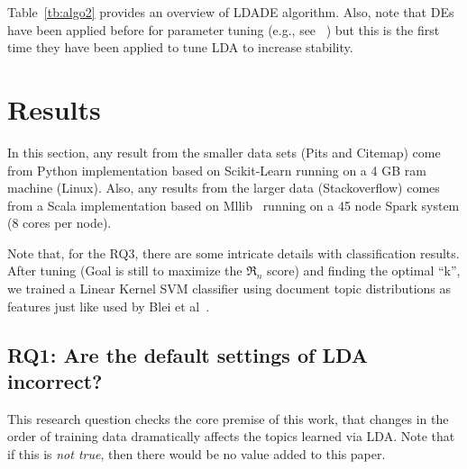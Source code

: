 \documentclass[twocolumn,5p,sort&compress]{elsarticle}
\theoremstyle{break}
\begin{document}
Table~\ref{tb:algo2} provides an overview of LDADE algorithm. Also, note that DEs have been
applied before for parameter tuning (e.g., see~\cite{omran2005differential,chiha2012tuning, fu2016tuning} ) but this is the first time they have been
applied to tune LDA to increase stability.

\section{Results}\label{sect:results}

In this section,
 any result from the smaller data sets (Pits and Citemap) come
from Python implementation based on Scikit-Learn running on a 4 GB ram machine (Linux).
Also,
  any results from the larger data (Stackoverflow) comes from a Scala implementation
  based on Mllib~\cite{meng2016mllib} running on a 45 node Spark system (8 cores per node).
  
  Note that, for the RQ3, there are some intricate details with classification results. After tuning (Goal is still to maximize the $\Re_n$ score) and finding the optimal ``k'', we trained a Linear Kernel SVM classifier using document topic distributions as features just like used by Blei et al~\cite{blei2003latent}. 


\subsection{\textbf{RQ1: Are the default settings of LDA incorrect?}}\label{sect:unstable}


This research question checks the core premise of this work, that changes
in the order of training data dramatically affects the topics learned via LDA.
Note that if this is {\em not true}, then there would be no value added to this paper. 
\end{document}
